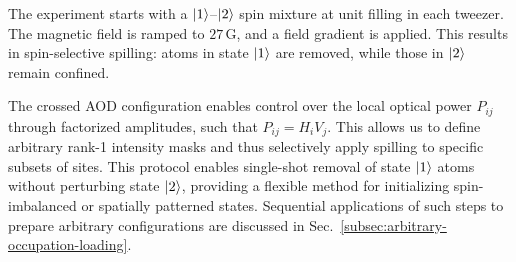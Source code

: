 The experiment starts with a $\left| 1 \right\rangle$–$\left| 2 \right\rangle$ spin mixture at unit filling in each tweezer. The magnetic field is ramped to $27\,\mathrm{G}$, and a field gradient is applied. This results in spin-selective spilling: atoms in state $\left| 1 \right\rangle$ are removed, while those in $\left| 2 \right\rangle$ remain confined.

The crossed AOD configuration enables control over the local optical power $P_{ij}$ through factorized amplitudes, such that $P_{ij} = H_i V_j$. This allows us to define arbitrary rank-1 intensity masks and thus selectively apply spilling to specific subsets of sites. 
This protocol enables single-shot removal of state $\left| 1 \right\rangle$ atoms without perturbing state $\left| 2 \right\rangle$, providing a flexible method for initializing spin-imbalanced or spatially patterned states. 
Sequential applications of such steps to prepare arbitrary configurations are discussed in Sec.~\ref{subsec:arbitrary-occupation-loading}.
